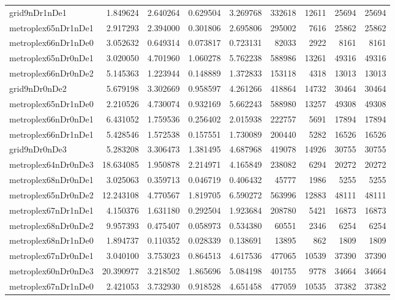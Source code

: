 \documentclass[../../../thesis.tex]{subfiles}
\begin{document}
\begin{longtable}{|l|r|r|r|r|r|r|r|r|}
grid9nDr1nDe1 & 1.849624 & 2.640264 & 0.629504 & 3.269768 & 332618 & 12611 & 25694 & 25694 \\
metroplex65nDr1nDe1 & 2.917293 & 2.394000 & 0.301806 & 2.695806 & 295002 & 7616 & 25862 & 25862 \\
metroplex66nDr1nDe0 & 3.052632 & 0.649314 & 0.073817 & 0.723131 & 82033 & 2922 & 8161 & 8161 \\
metroplex65nDr0nDe1 & 3.020050 & 4.701960 & 1.060278 & 5.762238 & 588986 & 13261 & 49316 & 49316 \\
metroplex66nDr0nDe2 & 5.145363 & 1.223944 & 0.148889 & 1.372833 & 153118 & 4318 & 13013 & 13013 \\
grid9nDr0nDe2 & 5.679198 & 3.302669 & 0.958597 & 4.261266 & 418864 & 14732 & 30464 & 30464 \\
metroplex65nDr1nDe0 & 2.210526 & 4.730074 & 0.932169 & 5.662243 & 588980 & 13257 & 49308 & 49308 \\
metroplex66nDr0nDe1 & 6.431052 & 1.759536 & 0.256402 & 2.015938 & 222757 & 5691 & 17894 & 17894 \\
metroplex66nDr1nDe1 & 5.428546 & 1.572538 & 0.157551 & 1.730089 & 200440 & 5282 & 16526 & 16526 \\
grid9nDr0nDe3 & 5.283208 & 3.306473 & 1.381495 & 4.687968 & 419078 & 14926 & 30755 & 30755 \\
metroplex64nDr0nDe3 & 18.634085 & 1.950878 & 2.214971 & 4.165849 & 238082 & 6294 & 20272 & 20272 \\
metroplex68nDr0nDe1 & 3.025063 & 0.359713 & 0.046719 & 0.406432 & 45777 & 1986 & 5255 & 5255 \\
metroplex65nDr0nDe2 & 12.243108 & 4.770567 & 1.819705 & 6.590272 & 563996 & 12883 & 48111 & 48111 \\
metroplex67nDr1nDe1 & 4.150376 & 1.631180 & 0.292504 & 1.923684 & 208780 & 5421 & 16873 & 16873 \\
metroplex68nDr0nDe2 & 9.957393 & 0.475407 & 0.058973 & 0.534380 & 60551 & 2346 & 6254 & 6254 \\
metroplex68nDr1nDe0 & 1.894737 & 0.110352 & 0.028339 & 0.138691 & 13895 & 862 & 1809 & 1809 \\
metroplex67nDr0nDe1 & 3.040100 & 3.753023 & 0.864513 & 4.617536 & 477065 & 10539 & 37390 & 37390 \\
metroplex60nDr0nDe3 & 20.390977 & 3.218502 & 1.865696 & 5.084198 & 401755 & 9778 & 34664 & 34664 \\
metroplex67nDr1nDe0 & 2.421053 & 3.732930 & 0.918528 & 4.651458 & 477059 & 10535 & 37382 & 37382 \\

\end{longtable}
\end{document}
